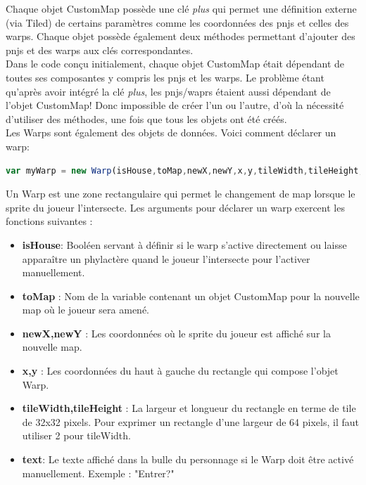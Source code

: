 \documentclass[11pt]{article}
\begin{document}
Chaque objet CustomMap possède une clé \textit{plus} qui permet une définition externe (via Tiled) de certains paramètres comme les coordonnées des pnjs et celles des warps. Chaque objet possède également deux méthodes permettant d'ajouter des pnjs et des warps aux clés correspondantes.\\

Dans le code conçu initialement, chaque objet CustomMap était dépendant de toutes ses composantes y compris les pnjs et les warps. Le problème étant qu'après avoir intégré la clé \textit{plus}, les pnjs/waprs étaient aussi dépendant de l'objet CustomMap! Donc impossible de créer l'un ou l'autre, d'où la nécessité d'utiliser des méthodes, une fois que tous les objets ont été créés. \\ 


Les Warps sont également des objets de données. Voici comment déclarer un warp: 

\begin{lstlisting}[language=JavaScript]
var myWarp = new Warp(isHouse,toMap,newX,newY,x,y,tileWidth,tileHeight,text);
\end{lstlisting} 
Un Warp est une zone rectangulaire qui permet le changement de map lorsque le sprite du joueur l'intersecte. Les arguments pour déclarer un warp exercent les fonctions suivantes : 
\begin{itemize}
\item \textbf{isHouse}: Booléen servant à définir si le warp s'active directement ou laisse apparaître un phylactère quand le joueur l'intersecte pour l'activer manuellement.
\item \textbf{toMap} : Nom de la variable contenant un objet CustomMap pour la nouvelle map où le joueur sera amené.
\item \textbf{newX,newY} : Les coordonnées où le sprite du joueur est affiché sur la nouvelle map.
\item \textbf{x,y} : Les coordonnées du haut à gauche du rectangle qui compose l'objet Warp.
\item \textbf{tileWidth,tileHeight} : La largeur et longueur du rectangle en terme de tile de 32x32 pixels. Pour exprimer un rectangle d'une largeur de 64 pixels, il faut utiliser 2 pour tileWidth.
\item \textbf{text}: Le texte affiché dans la bulle du personnage si le Warp doit être activé manuellement. Exemple : "Entrer?"
\end{itemize}
\end{document}
